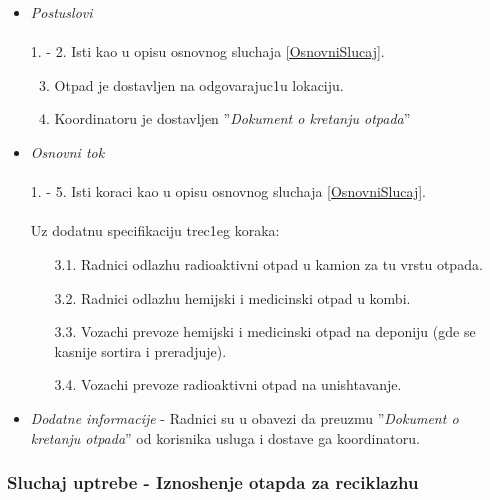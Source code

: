 \documentclass[10 pt]{article}
\begin{document}
\begin{itemize}
			\item\textit{Postuslovi}\\\\
				1. - 2. Isti kao u opisu osnovnog sluchaja \ref{OsnovniSlucaj}.
				\begin{enumerate}
					\setcounter{enumi}{2}
					\item Otpad je dostavljen na odgovarajuc1u lokaciju.
					\item Koordinatoru je dostavljen ''\textit{Dokument o kretanju otpada}''
				\end{enumerate}
			
			\item\textit{Osnovni tok}\\\\
				1. - 5. Isti koraci kao u opisu osnovnog sluchaja \ref{OsnovniSlucaj}.\\\\
				Uz dodatnu specifikaciju trec1eg koraka:
				\begin{enumerate}
					\item [3.1.] Radnici odlazhu radioaktivni otpad u kamion za tu vrstu otpada.
					\item [3.2.] Radnici odlazhu hemijski i medicinski otpad u kombi.
					\item [3.3.] Vozachi prevoze hemijski i medicinski otpad na deponiju (gde se kasnije sortira i preradjuje).
					\item [3.4.] Vozachi prevoze radioaktivni otpad na unishtavanje.
				\end{enumerate}
			
			\item\textit{Dodatne informacije} - Radnici su u obavezi da preuzmu ''\textit{Dokument o kretanju otpada}'' od korisnika usluga i dostave ga koordinatoru.
			
		\end{itemize}
	
	\subsubsection{Sluchaj uptrebe - Iznoshenje otapda za reciklazhu}
		
\end{document}
